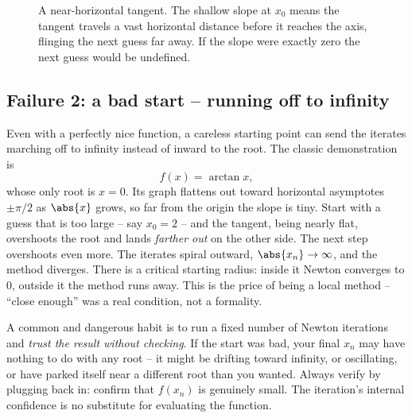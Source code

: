 \begin{figure}[H]
\centering
{}
\caption{A near-horizontal tangent. The shallow slope at $x_0$ means the tangent
travels a vast horizontal distance before it reaches the axis, flinging the next
guess far away. If the slope were exactly zero the next guess would be undefined.}
\label{ch19:fig-flat}
\end{figure}

\subsection{Failure 2: a bad start -- running off to infinity}

Even with a perfectly nice function, a careless starting point can send the
iterates marching off to infinity instead of inward to the root. The classic
demonstration is
\[
  f(x) = \arctan x,
\]
whose only root is $x = 0$. Its graph flattens out toward horizontal asymptotes
$\pm\pi/2$ as $\abs{x}$ grows, so far from the origin the slope is tiny. Start with a
guess that is too large -- say $x_0 = 2$ -- and the tangent, being nearly flat,
overshoots the root and lands \emph{farther out} on the other side. The next step
overshoots even more. The iterates spiral outward, $\abs{x_n} \to \infty$, and the
method diverges. There is a critical starting radius: inside it Newton converges to
$0$, outside it the method runs away. This is the price of being a local method --
``close enough'' was a real condition, not a formality.

\begin{trapbox}
A common and dangerous habit is to run a fixed number of Newton iterations and
\emph{trust the result without checking}. If the start was bad, your final $x_n$ may
have nothing to do with any root -- it might be drifting toward infinity, or
oscillating, or have parked itself near a different root than you wanted. Always
verify by plugging back in: confirm that $f(x_n)$ is genuinely small. The
iteration's internal confidence is no substitute for evaluating the function.
\end{trapbox}

